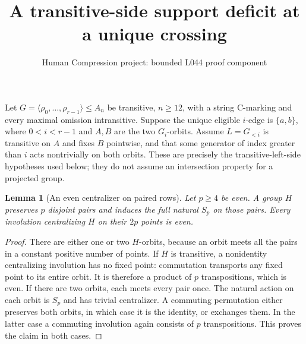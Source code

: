 \documentclass[11pt,a4paper]{article}
\title{A transitive-side support deficit at a unique crossing}
\author{Human Compression project: bounded L044 proof component}
\date{}
\newtheorem{lemma}{Lemma}
\newcommand{\gen}[1]{\langle#1\rangle}
\begin{document}
\maketitle
Let $G=\gen{\rho_0,\ldots,\rho_{r-1}}\leq A_n$ be transitive,
$n\geq12$, with a string C-marking and every maximal omission
intransitive. Suppose the unique eligible $i$-edge is
$\{a,b\}$, where $0<i<r-1$ and $A,B$ are the two $G_i$-orbits.
Assume $L=G_{<i}$ is transitive on $A$ and fixes $B$ pointwise,
and that some generator of index greater than $i$ acts
nontrivially on both orbits. These are precisely the
transitive-left-side hypotheses used below; they do not
assume an intersection property for a projected group.

\begin{lemma}[An even centralizer on paired rows]\label{centralizer}
Let $p\geq4$ be even. A group $H$ preserves $p$ disjoint
pairs and induces the full natural $S_p$ on those pairs.
Every involution centralizing $H$ on their $2p$ points is even.
\end{lemma}
\begin{proof}
There are either one or two $H$-orbits, because an orbit meets
all the pairs in a constant positive number of points.
If $H$ is transitive, a nonidentity centralizing involution
has no fixed point: commutation transports any fixed point
to its entire orbit. It is therefore a product of $p$
transpositions, which is even.
If there are two orbits, each meets every pair once. The
natural action on each orbit is $S_p$ and has trivial
centralizer. A commuting permutation either preserves both
orbits, in which case it is the identity, or exchanges them.
In the latter case a commuting involution again consists
of $p$ transpositions. This proves the claim in both cases.
\end{proof}
\end{document}
